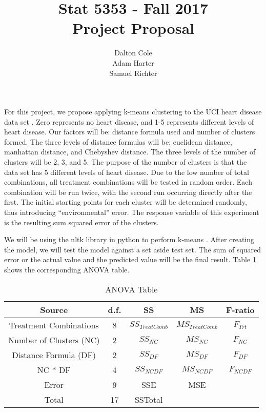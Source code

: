 \documentclass[times]{article}
\begin{document}
	\title{Stat 5353  - Fall 2017 \\ Project Proposal}
	\author{Dalton Cole \\ Adam Harter \\ Samuel Richter}
	\date{}
	\maketitle
	
	For this project, we propose applying k-means clustering to the UCI heart disease data set \cite{ref:uci}. 
   Zero represents no heart disease, and 1-5 represents different levels of heart disease.
   Our factors will be: distance formula used and number of clusters formed. 
   The three levels of distance formulas will be: euclidean distance, manhattan distance, and Chebyshev distance. 
   The three levels of the number of clusters will be 2, 3, and 5. 
   The purpose of the number of clusters is that the data set has 5 different levels of heart disease.
   Due to the low number of total combinations, all treatment combinations will be tested in random order.
   Each combination will be run twice, with the second run occurring directly after the first.
   The initial starting points for each cluster will be determined randomly, thus introducing ``environmental'' error. 
   The response variable of this experiment is the resulting sum squared error of the clusters.

	We will be using the nltk library in python to perform k-means \cite{ref:nltk}. 
   After creating the model, we will test the model against a set aside test set. 
   The sum of squared error or the actual value and the predicted value will be the final result. 
   Table \ref{tab:anova} shows the corresponding ANOVA table.

	\begin{table}[!h]
		\centering
		\caption{ANOVA Table}
		\label{tab:anova}
		\begin{tabular}{| c | c | c | c | c |}
			\hline
			Source 					& d.f.	& SS	& MS 	& F-ratio \\
			\hline
			Treatment Combinations	& 8		& $SS_{Treat Comb}$	& $MS_{Treat Comb}$	& $F_{Trt}$		\\
			\hline
			Number of Clusters (NC)	& 2		& $SS_{NC}$			& $MS_{NC}$			& $F_{NC}$ 		\\
			\hline
			Distance Formula (DF)	& 2		& $SS_{DF}$			& $MS_{DF}$			& $F_{DF}$ 		\\
			\hline
			NC * DF					& 4 	& $SS_{NC DF}$		& $MS_{NC DF}$		& $F_{NC DF}$ 	\\
			\hline
			Error					& 9 	& SSE				& MSE				& 				\\
			\hline
			Total					& 17 	& SSTotal			& 					& 				\\
			\hline
		\end{tabular}
	\end{table}

	\medskip
	
	
\end{document}
